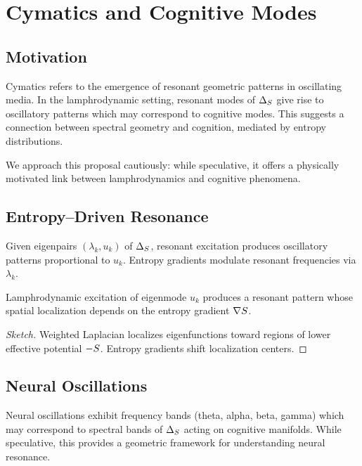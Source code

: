 
\chapter{Cymatics and Cognitive Modes}
\label{chap:cymatics}

\section{Motivation}

Cymatics refers to the emergence of resonant geometric patterns in
oscillating media. In the lamphrodynamic setting, resonant modes of
$\Delta_{S}$ give rise to oscillatory patterns which may correspond
to cognitive modes. This suggests a connection between spectral geometry
and cognition, mediated by entropy distributions.

We approach this proposal cautiously: while speculative, it offers a
physically motivated link between lamphrodynamics and cognitive
phenomena.


\section{Entropy--Driven Resonance}

Given eigenpairs $(\lambda_k,u_k)$ of $\Delta_{S}$, resonant
excitation produces oscillatory patterns proportional to $u_k$. Entropy
gradients modulate resonant frequencies via $\lambda_k$.

\begin{proposition}
Lamphrodynamic excitation of eigenmode $u_k$ produces a resonant pattern
whose spatial localization depends on the entropy gradient
$\nabla S$.
\end{proposition}

\begin{proof}[Sketch]
Weighted Laplacian localizes eigenfunctions toward regions of lower
effective potential $-S$. Entropy gradients shift localization
centers.
\end{proof}


\section{Neural Oscillations}

Neural oscillations exhibit frequency bands (theta, alpha, beta, gamma)
which may correspond to spectral bands of $\Delta_{S}$ acting on
cognitive manifolds. While speculative, this provides a geometric
framework for understanding neural resonance.

